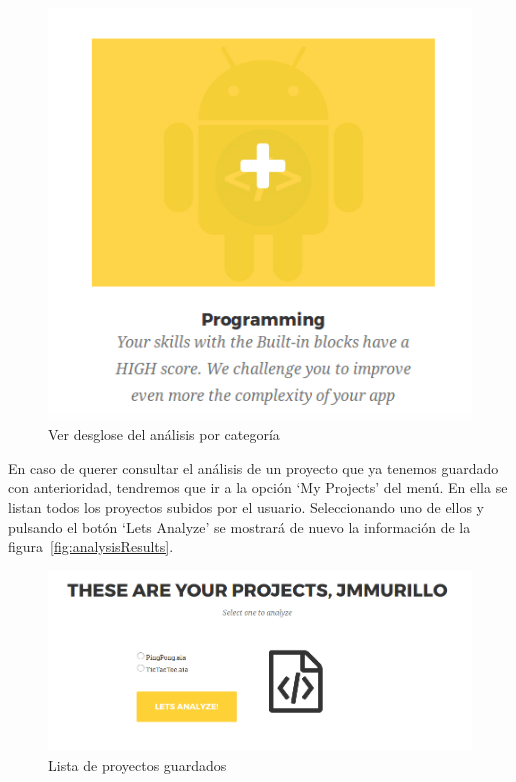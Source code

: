 \documentclass[a4paper, 12pt]{book}
\begin{document}
\begin{figure}[H]
  \centering
  \includegraphics[width=0.60\linewidth, keepaspectratio]{img/popupoption}
  \caption{Ver desglose del análisis por categoría}
  \label{fig:popupoption}
\end{figure}

En caso de querer consultar el análisis de un proyecto que ya tenemos guardado con anterioridad, tendremos que ir a la opción `My Projects' del menú. En ella se listan todos los proyectos subidos por el usuario. Seleccionando uno de ellos y pulsando el botón `Lets Analyze' se mostrará de nuevo la información de la figura~\ref{fig:analysisResults}.
\begin{figure}[H]
  \centering
  \includegraphics[width=\linewidth, keepaspectratio]{img/userproyects}
  \caption{Lista de proyectos guardados}
  \label{fig:popupoption}
\end{figure}
\end{document}
